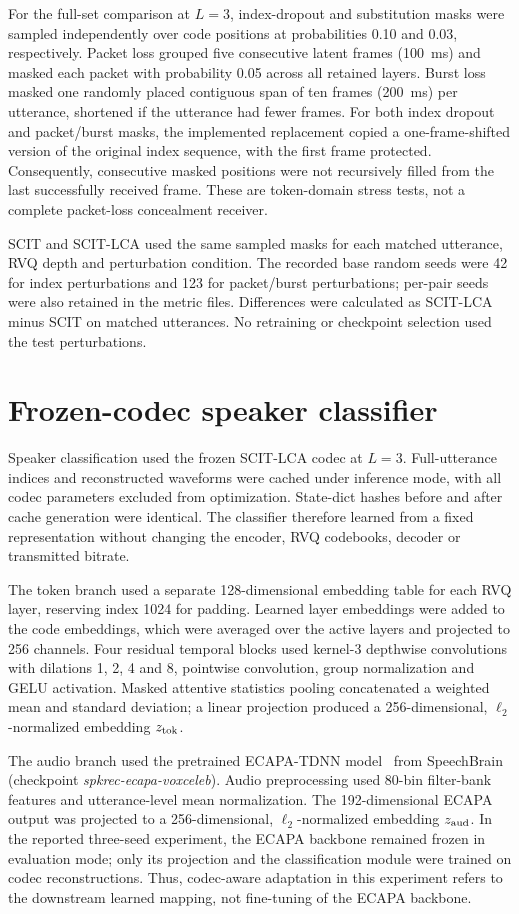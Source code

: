 For the full-set comparison at $L=3$, index-dropout and substitution masks were sampled independently over code positions at probabilities 0.10 and 0.03, respectively. Packet loss grouped five consecutive latent frames (100~ms) and masked each packet with probability 0.05 across all retained layers. Burst loss masked one randomly placed contiguous span of ten frames (200~ms) per utterance, shortened if the utterance had fewer frames. For both index dropout and packet/burst masks, the implemented replacement copied a one-frame-shifted version of the original index sequence, with the first frame protected. Consequently, consecutive masked positions were not recursively filled from the last successfully received frame. These are token-domain stress tests, not a complete packet-loss concealment receiver.

SCIT and SCIT-LCA used the same sampled masks for each matched utterance, RVQ depth and perturbation condition. The recorded base random seeds were 42 for index perturbations and 123 for packet/burst perturbations; per-pair seeds were also retained in the metric files. Differences were calculated as SCIT-LCA minus SCIT on matched utterances. No retraining or checkpoint selection used the test perturbations.

\section{Frozen-codec speaker classifier}
Speaker classification used the frozen SCIT-LCA codec at $L=3$. Full-utterance indices and reconstructed waveforms were cached under inference mode, with all codec parameters excluded from optimization. State-dict hashes before and after cache generation were identical. The classifier therefore learned from a fixed representation without changing the encoder, RVQ codebooks, decoder or transmitted bitrate.

The token branch used a separate 128-dimensional embedding table for each RVQ layer, reserving index 1024 for padding. Learned layer embeddings were added to the code embeddings, which were averaged over the active layers and projected to 256 channels. Four residual temporal blocks used kernel-3 depthwise convolutions with dilations 1, 2, 4 and 8, pointwise convolution, group normalization and GELU activation. Masked attentive statistics pooling concatenated a weighted mean and standard deviation; a linear projection produced a 256-dimensional, $\ell_2$-normalized embedding $z_{\rm tok}$.

The audio branch used the pretrained ECAPA-TDNN model~\cite{ecapa} from SpeechBrain (checkpoint \textit{spkrec-ecapa-voxceleb}). Audio preprocessing used 80-bin filter-bank features and utterance-level mean normalization. The 192-dimensional ECAPA output was projected to a 256-dimensional, $\ell_2$-normalized embedding $z_{\rm aud}$. In the reported three-seed experiment, the ECAPA backbone remained frozen in evaluation mode; only its projection and the classification module were trained on codec reconstructions. Thus, codec-aware adaptation in this experiment refers to the downstream learned mapping, not fine-tuning of the ECAPA backbone.

